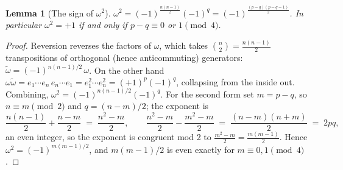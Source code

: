 \documentclass[11pt]{article}
\newtheorem{lemma}[theorem]{Lemma}
\theoremstyle{definition}
\theoremstyle{plain}
\begin{document}
\begin{lemma}[The sign of $\omega^2$]\label{c:primer.sign}
$\displaystyle \omega^2 = (-1)^{\tfrac{n(n-1)}{2}} (-1)^q = (-1)^{\tfrac{(p-q)(p-q-1)}{2}}$. In particular $\omega^2 = +1$ if and only if $p - q \equiv 0$ or $1 \pmod 4$.
\end{lemma}
\begin{proof}
Reversion reverses the factors of $\omega$, which takes $\binom{n}{2} = \tfrac{n(n-1)}{2}$ transpositions of orthogonal (hence anticommuting) generators: $\tilde{\omega} = (-1)^{n(n-1)/2}\,\omega$. On the other hand $\omega \tilde{\omega} = e_1 \cdots e_n\, e_n \cdots e_1 = e_1^2 \cdots e_n^2 = (+1)^p(-1)^q$, collapsing from the inside out. Combining, $\omega^2 = (-1)^{n(n-1)/2}(-1)^q$. For the second form set $m = p - q$, so $n \equiv m \pmod 2$ and $q = (n-m)/2$; the exponent is
\[
\frac{n(n-1)}{2} + \frac{n-m}{2} \;=\; \frac{n^2 - m}{2},
\qquad
\frac{n^2 - m}{2} - \frac{m^2 - m}{2} \;=\; \frac{(n-m)(n+m)}{2} \;=\; 2pq,
\]
an even integer, so the exponent is congruent mod 2 to $\tfrac{m^2 - m}{2} = \tfrac{m(m-1)}{2}$. Hence $\omega^2 = (-1)^{m(m-1)/2}$, and $m(m-1)/2$ is even exactly for $m \equiv 0, 1 \pmod 4$.

\end{proof}
\end{document}
